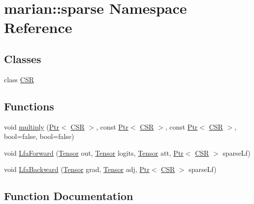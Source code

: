 \hypertarget{namespacemarian_1_1sparse}{}\section{marian\+:\+:sparse Namespace Reference}
\label{namespacemarian_1_1sparse}
\subsection*{Classes}
\begin{DoxyCompactItemize}
\item 
class \hyperlink{classmarian_1_1sparse_1_1CSR}{C\+SR}
\end{DoxyCompactItemize}
\subsection*{Functions}
\begin{DoxyCompactItemize}
\item 
void \hyperlink{namespacemarian_1_1sparse_ad5213500007ccc462473804a1374c1ff}{multiply} (\hyperlink{namespacemarian_ad1a373be43a00ef9ce35666145137b08}{Ptr}$<$ \hyperlink{classmarian_1_1sparse_1_1CSR}{C\+SR} $>$, const \hyperlink{namespacemarian_ad1a373be43a00ef9ce35666145137b08}{Ptr}$<$ \hyperlink{classmarian_1_1sparse_1_1CSR}{C\+SR} $>$, const \hyperlink{namespacemarian_ad1a373be43a00ef9ce35666145137b08}{Ptr}$<$ \hyperlink{classmarian_1_1sparse_1_1CSR}{C\+SR} $>$, bool=false, bool=false)
\item 
void \hyperlink{namespacemarian_1_1sparse_ac9a85dbc1c93bd5cf582d9f298203d55}{Lfa\+Forward} (\hyperlink{namespacemarian_a88b71ec34bb354564cddc24eb80f7e14}{Tensor} out, \hyperlink{namespacemarian_a88b71ec34bb354564cddc24eb80f7e14}{Tensor} logits, \hyperlink{namespacemarian_a88b71ec34bb354564cddc24eb80f7e14}{Tensor} att, \hyperlink{namespacemarian_ad1a373be43a00ef9ce35666145137b08}{Ptr}$<$ \hyperlink{classmarian_1_1sparse_1_1CSR}{C\+SR} $>$ sparse\+Lf)
\item 
void \hyperlink{namespacemarian_1_1sparse_ae51a1c2f9f89106dde6193dcf00a7b76}{Lfa\+Backward} (\hyperlink{namespacemarian_a88b71ec34bb354564cddc24eb80f7e14}{Tensor} grad, \hyperlink{namespacemarian_a88b71ec34bb354564cddc24eb80f7e14}{Tensor} adj, \hyperlink{namespacemarian_ad1a373be43a00ef9ce35666145137b08}{Ptr}$<$ \hyperlink{classmarian_1_1sparse_1_1CSR}{C\+SR} $>$ sparse\+Lf)
\end{DoxyCompactItemize}


\subsection{Function Documentation}
